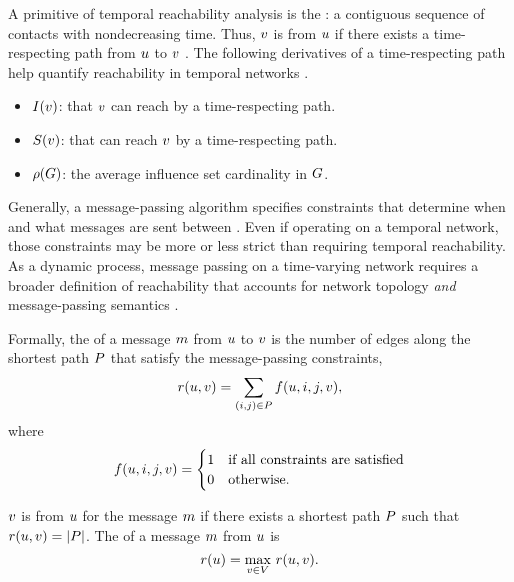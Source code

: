A primitive of temporal reachability analysis is the : a contiguous sequence of contacts with nondecreasing time. Thus, \vertexName $v$ is  from \vertexName $u$ if there exists a time-respecting path from $u$ to $v$ \citep{Moody2002}. The following derivatives of a time-respecting path help quantify reachability in temporal networks \citep{Holme2012}.
\begin{itemize}
  \item {} $I(v)$: \verticesName that $v$ can reach by a time-respecting path.
  \item {} $S(v)$: \verticesName that can reach $v$ by a time-respecting path.
  \item {} $\rho(G)$: the average influence set cardinality in $G$.
\end{itemize}
Generally, a message-passing algorithm specifies constraints that determine when and what messages are sent between \verticesName. Even if operating on a temporal network, those constraints may be more or less strict than requiring temporal reachability. As a dynamic process, message passing on a time-varying network requires a broader definition of reachability that accounts for network topology \emph{and} message-passing semantics \citep{Barrat2013}.

Formally, the  of a message $m$ from \vertexName $u$ to \vertexName $v$ is the number of edges along the shortest path $P$ that satisfy the message-passing constraints,
\begin{equation*}
  r(u, v) = \sum_{(i, j) \in P} f(u, i, j, v),
\end{equation*}
where
\begin{equation*}
  f(u, i, j, v) = 
    \begin{cases}
      1 & \text{if all constraints are satisfied} \\ 
      0 & \text{otherwise.}
    \end{cases}
\end{equation*}

\VertexName $v$ is  from \vertexName $u$ for the message $m$ if there exists a shortest path $P$ such that $r(u, v) = \left\vert P \right\vert$. The  of a message $m$ from \vertexName $u$ is
\begin{equation}\label{eq:vreach}
  r(u) = \max_{v \in V} \, r(u, v).
\end{equation}

